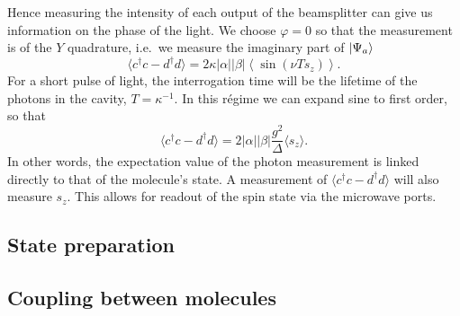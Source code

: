 Hence measuring the intensity of each output of the beamsplitter can give us
information on the phase of the light. We choose $\varphi = 0$ so that the
measurement is of the $Y$ quadrature, i.e.\ we measure the imaginary part of
$\ket{\Psi_a}$
%
\begin{equation}
  \langle c^\dagger c - d^\dagger d\rangle =  2\kappa
  |\alpha||\beta|\left\langle\sin(\nu T s_z)\right\rangle.
\end{equation}
%
For a short pulse of light, the interrogation time will be the lifetime of the
photons in the cavity, $T = \kappa^{-1}$. In this r\'egime we can expand sine
to first order, so that
%
\begin{equation}
  \langle c^\dagger c - d^\dagger d\rangle = 2|\alpha||\beta|
  \frac{g^2}{\Delta}\langle s_z\rangle.
  \label{eqn:homomeas}
\end{equation}
%
In other words, the expectation value of the photon measurement is linked
directly to that of the molecule's state. A measurement of $\langle c^\dagger c
- d^\dagger d\rangle$ will also measure $s_z$. This allows for readout of the
spin state via the microwave ports.


\subsection{State preparation}



\subsection{Coupling between molecules}



